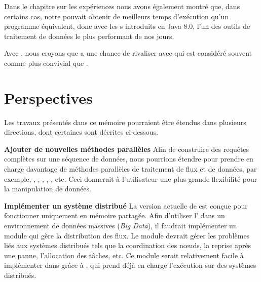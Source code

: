 \begin{conclusion}
Dans le chapitre sur les exp\'eriences nous avons \'egalement montr\'e que, dans certains cas, notre  pouvait obtenir de meilleurs temps d'ex\'ecution qu'un programme  \'equivalent, donc avec les s introduits en Java 8.0, l'un des outils de traitement de donn\'ees le plus performant de nos jours.

Avec , nous croyons que  a une chance de rivaliser avec  qui est consid\'er\'e souvent comme plus convivial que . 


\section*{\textbf{Perspectives}}

Les travaux pr\'esent\'es dans ce m\'emoire pourraient \^etre \'etendus dans plusieurs directions, dont certaines sont d\'ecrites ci-dessous.

\textbf{Ajouter de nouvelles m\'ethodes parall\`eles} Afin de construire des requ\^etes compl\`etes sur une s\'equence de donn\'ees, nous pourrions \'etendre  pour prendre en charge davantage de m\'ethodes parall\`eles de traitement de flux et de donn\'ees, par exemple, , , , , , etc. Ceci donnerait \`a l'utilisateur une plus grande flexibilit\'e pour la manipulation de donn\'ees.

\textbf{Impl\'ementer un syst\`eme distribu\'e} La version actuelle de  est con\c cue pour fonctionner uniquement en m\'emoire partag\'ee. Afin d'utiliser l' dans un environnement de donn\'ees massives (\emph{Big Data}), il faudrait impl\'ementer un module qui g\`ere la distribution des flux. Le module devrait g\'erer les probl\`emes li\'es aux syst\`emes distribu\'es tels que la coordination des nœuds, la reprise apr\`es une panne, l'allocation des t\^aches, etc. Ce module serait relativement facile \`a impl\'ementer dans  gr\^ace \`a , qui prend d\'ej\`a en charge l'ex\'ecution sur des syst\`emes distribu\'es.


\end{conclusion}




